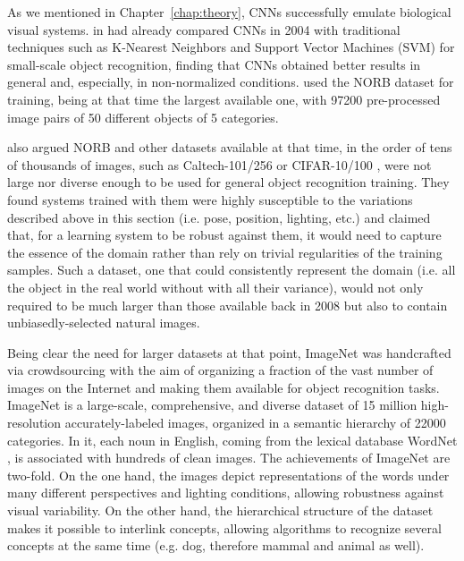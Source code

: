 As we mentioned in Chapter~\ref{chap:theory}, CNNs successfully emulate biological visual systems.
\citeauthor{LeCun2004} in \cite{LeCun2004} had already compared CNNs in 2004 with traditional techniques such as K-Nearest Neighbors and Support Vector Machines (SVM) for small-scale object recognition, finding that CNNs obtained better results in general and, especially, in non-normalized conditions.
\citeauthor{LeCun2004} used the NORB dataset for training, being at that time the largest available one, with 97200 pre-processed image pairs of 50 different objects of 5 categories.

\citeauthor{Pinto2008} also argued NORB and other datasets available at that time, in the order of tens of thousands of images, such as Caltech-101/256 \cite{Fei-Fei2007,Griffin2007} or CIFAR-10/100 \cite{Krizhevsky2009}, were not large nor diverse enough to be used for general object recognition training.
They found systems trained with them were highly susceptible to the variations described above in this section (i.e. pose, position, lighting, etc.) and claimed that, for a learning system to be robust against them, it would need to capture the essence of the domain rather than rely on trivial regularities of the training samples.
Such a dataset, one that could consistently represent the domain (i.e. all the object in the real world without with all their variance), would not only required to be much larger than those available back in 2008 but also to contain unbiasedly-selected natural images.

Being clear the need for larger datasets at that point, ImageNet \cite{Deng2009} was handcrafted via crowdsourcing with the aim of organizing a fraction of the vast number of images on the Internet and making them available for object recognition tasks.
ImageNet is a large-scale, comprehensive, and diverse dataset of 15 million high-resolution accurately-labeled images, organized in a semantic hierarchy of 22000 categories.
In it, each noun in English, coming from the lexical database WordNet \cite{Wilkniss1998}, is associated with hundreds of clean images.
The achievements of ImageNet are two-fold.
On the one hand, the images depict representations of the words under many different perspectives and lighting conditions, allowing robustness against visual variability.
On the other hand, the hierarchical structure of the dataset makes it possible to interlink concepts, allowing algorithms to recognize several concepts at the same time (e.g. dog, therefore mammal and animal as well).

